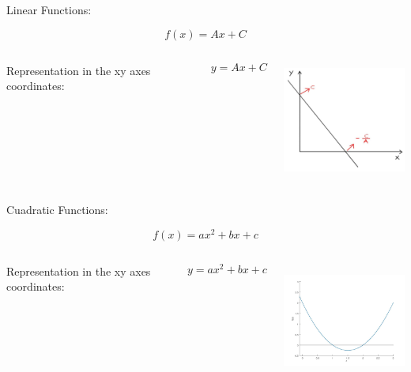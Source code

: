 \documentclass[]{beamer}
\begin{document}
\begin{frame}

Linear Functions:

\begin{equation*}
f(x)=Ax+C
\end{equation*}


\pause

   \begin{columns}[c]
   \column{2in}  %
Representation in the xy axes coordinates:

\begin{equation*}
y=Ax+C
\end{equation*}

  
   \column{2in}




  \begin{center}
  \includegraphics[height=1.5in]{images/function.jpg}
\end{center}


   \end{columns}


 \end{frame}
\begin{frame}

Cuadratic Functions:

\begin{equation*}
f(x)=ax^2+bx+c
\end{equation*}


\pause

   \begin{columns}[c]
   \column{2in}  %
Representation in the xy axes coordinates:

\begin{equation*}
y=ax^2+bx+c
\end{equation*}

  
   \column{2in}




  \begin{center}
  \includegraphics[height=1.5in]{images/cuadratic.jpg}
\end{center}


   \end{columns}


 \end{frame}
\end{document}
